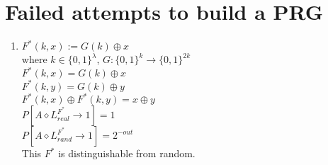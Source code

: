 \documentclass{report}
\begin{document}
	\section*{Failed attempts to build a PRG}
	\begin{enumerate}[1.]
		\item $F^{*}(k,x) := G(k) \oplus x$ \\
		where $k \in \{ 0,1 \} ^{\lambda}$, $G: \{ 0,1 \} ^{k} \rightarrow \{ 0,1 \}^{2k}$ \\
		$F^{*}(k,x) =  G(k) \oplus x$ \\
		$F^{*}(k,y) =  G(k) \oplus y$ \\
		$F^{*}(k,x) \oplus F^{*}(k,y) =  x \oplus y$ \\
		$P[A \diamond L^{F^{*}}_{real} \rightarrow 1] = 1$ \\
		$P[A \diamond L^{F^{*}}_{rand} \rightarrow 1] = 2^{-out}$ \\
		This $F^{*}$ is distinguishable from random.
		
	\end{enumerate}
	
\end{document}
